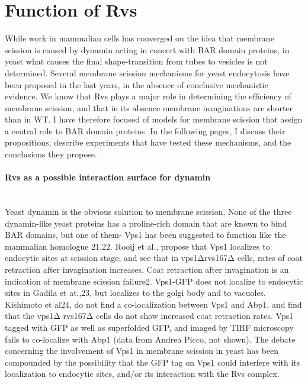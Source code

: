		
\section{Function of Rvs}


While work in mammalian cells has converged on the idea that membrane scission is caused by dynamin acting in concert with BAR domain proteins, in yeast what causes the final shape-transition from tubes to vesicles is not determined. Several membrane scission mechanisms for yeast endocytosis have been proposed in the last years, in the absence of conclusive mechanistic evidence. We know that Rvs plays a major role in determining the efficiency of membrane scission, and that in its absence membrane invaginations are shorter than in WT. I have therefore focused of models for membrane scission that assign a central role to BAR domain proteins. In the following pages, I discuss their propositions, describe experiments that have tested these mechanisms, and the conclusions they propose. 



		\paragraph{Rvs as a possible interaction surface for dynamin }
	\mbox{}\\
Yeast dynamin is the obvious solution to membrane scission. None of the three dynamin-like yeast proteins has a proline-rich domain that are known to bind BAR domains, but one of them- Vps1 has been suggested to function like the mammalian homologue 21,22. Rooij et al., propose that Vps1 localizes to endocytic sites at scission stage, and see that in vps1Δrvs167Δ cells, rates of coat retraction after invagination increases. Coat retraction after invagination is an indication of membrane scission failure2. Vps1-GFP does not localize to endocytic sites in Gadila et at.,23, but localizes to the golgi body and to vacuoles. Kishimoto et al24, do not find a co-localization between Vps1 and Abp1, and find that the vps1Δ rvs167Δ  cells do not show increased coat retraction rates. Vps1 tagged with GFP as well as superfolded GFP, and imaged by TIRF microscopy fails to co-localize with Abp1 (data from Andrea Picco, not shown). The debate concerning the involvement of Vps1 in membrane scission in yeast has been compounded by the possibility that the GFP tag on Vps1 could interfere with its localization to endocytic sites, and/or its interaction with the Rvs complex. 

